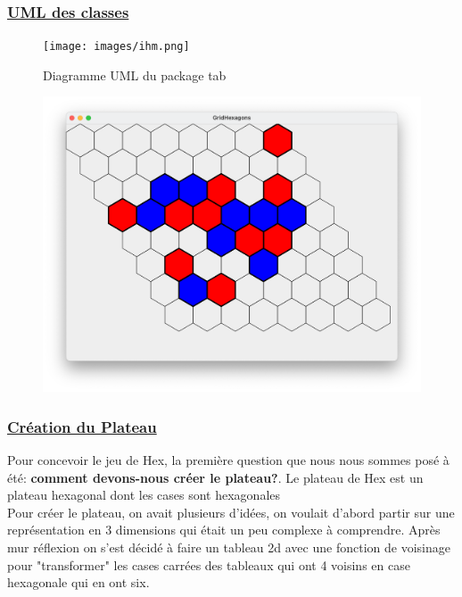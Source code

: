 \documentclass[12pt]{article}
\begin{document}
 \subsubsection{\underline{UML des classes}}
	\begin{figure}[h!]
		\begin{center}
			\texttt{[image: images/ihm.png]}
		\end{center}
		\caption{Diagramme UML du package tab}
		\label{tabuml}
	\end{figure}
	\begin{figure}[h!]
		\begin{center}
			\includegraphics[width=1\textwidth]{images/Board.png}
		\end{center}
		\label{tabuml}
	\end{figure}
\newpage
	\subsubsection{\underline{Création du Plateau}}
	Pour concevoir le jeu de Hex, la première question que nous nous sommes posé à été: \textbf{comment devons-nous créer le plateau?}. 
	Le plateau de Hex est un plateau hexagonal dont les cases sont hexagonales
	\\
	Pour créer le plateau, on avait plusieurs d'idées, on  voulait d'abord partir sur une représentation en 3 dimensions qui était un peu complexe à comprendre. Après mur réflexion on s'est décidé à faire un tableau 2d avec une fonction de voisinage pour "transformer" les cases carrées des tableaux qui ont 4 voisins en case hexagonale qui en ont six. \\
	
\end{document}
